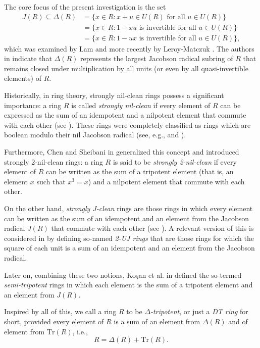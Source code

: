 \documentclass[12pt]{amsart}
\theoremstyle{definition}
\begin{document}
The core focus of the present investigation is the set
\begin{align*}
  J(R) \subseteq \Delta(R) &= \{ x \in R : x + u \in U(R) \text{ for all } u \in U(R) \} \\
                           &= \{ x \in R : 1 - xu \text{ is invertible for all } u \in U(R) \} \\
                           &= \{ x \in R : 1 - ux \text{ is invertible for all } u \in U(R) \},
\end{align*}
which was examined by Lam \cite[Exercise 4.24]{lame} and more recently by Leroy-Matczuk \cite{lmr}. The authors in \cite[Theorems 3 and 6]{lmr} indicate that \( \Delta(R) \) represents the largest Jacobson radical subring of \( R \) that remains closed under multiplication by all units (or even by all quasi-invertible elements) of \( R \).

Historically, in ring theory, strongly nil-clean rings possess a significant importance: a ring \(R\) is called \textit{strongly nil-clean} if every element of \(R\) can be expressed as the sum of an idempotent and a nilpotent element that commute with each other (see \cite{chenb, diesl, kzw}). These rings were completely classified as rings which are boolean modulo their nil Jacobson radical (see, e.g., \cite{dl} and \cite{kwz}).

Furthermore, Chen and Sheibani in \cite{css} generalized this concept and introduced strongly 2-nil-clean rings: a ring \(R\) is said to be \textit{strongly 2-nil-clean} if every element of \(R\) can be written as the sum of a tripotent element (that is, an element \(x\) such that \(x^3 = x\)) and a nilpotent element that commute with each other.

On the other hand, \textit{strongly J-clean} rings are those rings in which every element can be written as the sum of an idempotent and an element from the Jacobson radical \(J(R)\) that commute with each other (see \cite{csj, chensjc}). A relevant version of this is considered in \cite{cui} by defining so-named {\it 2-UJ rings} that are those rings for which the square of each unit is a sum of an idempotent and an element from the Jacobson radical.

Later on, combining these two notions, Ko\c{s}an et al. in \cite{kyzr} defined the so-termed \textit{semi-tripotent} rings in which each element is the sum of a tripotent element and an element from \(J(R)\).

Inspired by all of this, we call a ring $R$ to be {\it $\Delta$-tripotent}, or just a {\it DT ring} for short, provided every element of $R$ is a sum of an element from $\Delta(R)$ and of element from $\text{Tr}(R)$, i.e., $$R=\Delta(R)+\text{Tr}(R).$$
\end{document}
